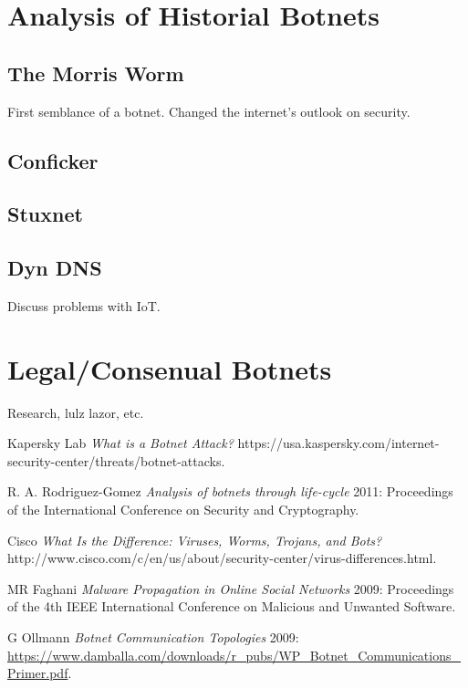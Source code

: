 \section{Analysis of Historial Botnets}

\subsection{The Morris Worm}
First semblance of a botnet.  Changed the internet's outlook on security.

\subsection{Conficker}

\subsection{Stuxnet}

\subsection{Dyn DNS}
Discuss problems with IoT.

\section{Legal/Consenual Botnets}
Research, lulz lazor, etc.

\pagebreak
\begin{thebibliography}{1}

   Kapersky Lab {\em What is a Botnet Attack?}  https://usa.kaspersky.com/internet-security-center/threats/botnet-attacks.

   R. A. Rodriguez-Gomez {\em Analysis of botnets through life-cycle} 2011:
  Proceedings of the International Conference on Security and Cryptography.

   Cisco {\em What Is the Difference: Viruses, Worms, Trojans, and Bots?}  http://www.cisco.com/c/en/us/about/security-center/virus-differences.html.

   MR Faghani {\em Malware Propagation in Online Social Networks} 2009:
  Proceedings of the 4th IEEE International Conference on Malicious and Unwanted Software.
  
   G Ollmann {\em Botnet Communication Topologies} 2009:
    \url{https://www.damballa.com/downloads/r_pubs/WP_Botnet_Communications_Primer.pdf}.

\end{thebibliography}


